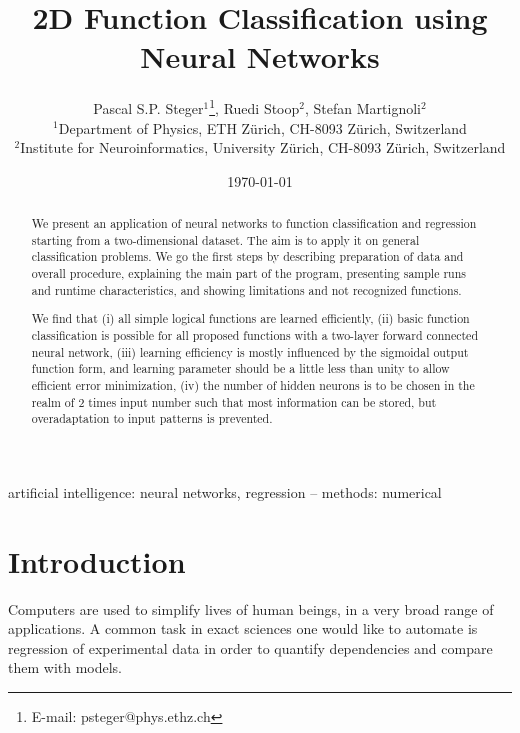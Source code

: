 \documentclass[useAMS,usenatbib]{mn2e}
\begin{document}
%
\title[2D Function Classification using Neural Networks]
       {2D Function Classification using Neural Networks}
%
\author[P. Steger et al.]{Pascal S.P. Steger$^{1}$\thanks{E-mail: psteger@phys.ethz.ch},
  Ruedi Stoop$^{2}$,
  Stefan Martignoli$^{2}$\\
  $^{1}$Department of Physics, 
  ETH Z\"urich, 
  CH-8093 Z\"urich,
  Switzerland\\
  $^{2}$Institute for Neuroinformatics, 
  University Z\"urich, 
  CH-8093 Z\"urich, 
  Switzerland
}
%
%
\date{\today}
\pagerange{\pageref{firstpage}--\pageref{lastpage}} 
\maketitle
\label{firstpage}
\begin{abstract}
  We present an application of neural networks to function
  classification and regression starting from a two-dimensional
  dataset. The aim is to apply it on general classification
  problems. We go the first steps by describing preparation of data
  and overall procedure, explaining the main part of the program,
  presenting sample runs and runtime characteristics, and showing
  limitations and not recognized functions.

  We find that (i) all simple logical functions are learned
  efficiently, (ii) basic function classification is possible for all
  proposed functions with a two-layer forward connected neural
  network, (iii) learning efficiency is mostly influenced by the
  sigmoidal output function form, and learning parameter should be a
  little less than unity to allow efficient error minimization, (iv)
  the number of hidden neurons is to be chosen in the realm of 2 times
  input number such that most information can be stored, but
  overadaptation to input patterns is prevented.
\end{abstract}
%
\begin{keywords}
  artificial intelligence: neural networks, regression --
  methods: numerical
\end{keywords}
%
\section{Introduction}
\label{sec:Introduction}
Computers are used to simplify lives of human beings, in a very broad
range of applications. A common task in exact sciences one would like
to automate is regression of experimental data in order to quantify
dependencies and compare them with models.
\end{document}

